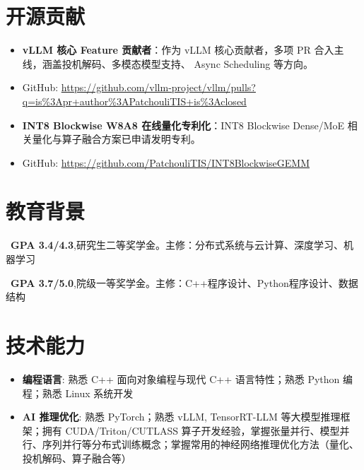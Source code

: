 \documentclass{resume}
\begin{document}
\section{开源贡献}
\begin{itemize}[parsep=0.2ex]
  \item \textbf{vLLM 核心 Feature 贡献者}：作为 vLLM 核心贡献者，多项 PR 合入主线，涵盖投机解码、多模态模型支持、 Async Scheduling 等方向。
  \item GitHub: \url{https://github.com/vllm-project/vllm/pulls?q=is%3Apr+author%3APatchouliTIS+is%3Aclosed}
\end{itemize}
\begin{itemize}[parsep=0.2ex]
  \item \textbf{INT8 Blockwise W8A8 在线量化专利化}：INT8 Blockwise Dense/MoE 相关量化与算子融合方案已申请发明专利。
  \item GitHub: \url{https://github.com/PatchouliTIS/INT8BlockwiseGEMM}
\end{itemize}


\section{教育背景}
\ \textbf{GPA 3.4/4.3},研究生二等奖学金。主修：分布式系统与云计算、深度学习、机器学习

\ \textbf{GPA 3.7/5.0},院级一等奖学金。主修：C++程序设计、Python程序设计、数据结构

\section{技术能力}
\begin{itemize}[parsep=0.2ex]
  \item \textbf{编程语言}: 熟悉 C++ 面向对象编程与现代 C++ 语言特性；熟悉 Python 编程；熟悉 Linux 系统开发
  \item \textbf{AI 推理优化}: 熟悉 PyTorch；熟悉 vLLM, TensorRT-LLM 等大模型推理框架；拥有 CUDA/Triton/CUTLASS 算子开发经验，掌握张量并行、模型并行、序列并行等分布式训练概念；掌握常用的神经网络推理优化方法（量化、投机解码、算子融合等）
\end{itemize}
\end{document}
